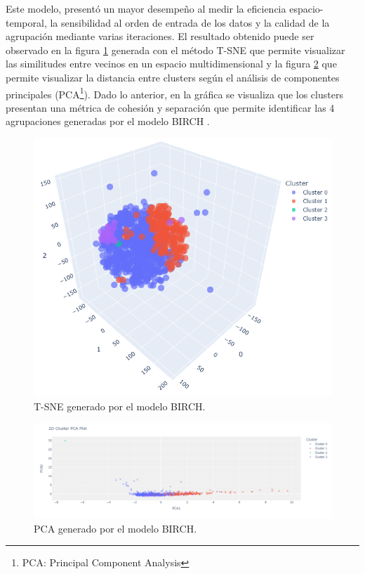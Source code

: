 Este modelo, presentó un mayor desempeño al medir la eficiencia espacio-temporal, la sensibilidad al orden de entrada de los datos y la calidad de la agrupación mediante varias iteraciones. El resultado obtenido puede ser observado en la figura \ref{BIRCH_TSNE} generada con el método T-SNE que permite visualizar las similitudes entre vecinos en un espacio multidimensional y la figura \ref{BIRCH_PCA} que permite visualizar la distancia entre clusters según el análisis de componentes principales (PCA\footnote{PCA: Principal Component Analysis}). Dado lo anterior, en la gráfica se visualiza que los clusters presentan una métrica de cohesión y separación que permite identificar las 4 agrupaciones generadas por el modelo BIRCH .

\begin{figure}
	\centering
	\includegraphics[width=0.5
	\linewidth]{NOTEBOOK/IMAGENES_CLUSTERING/8_TNSE_Birch_Clustering}
	\caption{T-SNE generado por el modelo BIRCH.}
	\label{BIRCH_TSNE}
\end{figure}

\begin{figure}
	\centering
	\includegraphics[width=1
	\linewidth]{NOTEBOOK/IMAGENES_CLUSTERING/8_PCA_Birch_Clustering}
	\caption{PCA generado por el modelo BIRCH.}
	\label{BIRCH_PCA}
\end{figure}

